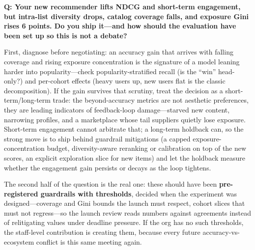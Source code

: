 \begin{interviewq}

\end{interviewq}

\begin{interviewq}
\textbf{Q: Your new recommender lifts NDCG and short-term engagement, but intra-list diversity drops, catalog coverage falls, and exposure Gini rises 6 points. Do you ship it---and how should the evaluation have been set up so this is not a debate?}

 \quad {} \quad \badgefreq{\freqmed}

\stronganswer

First, diagnose before negotiating: an accuracy gain that arrives with falling coverage and rising exposure concentration is the signature of a model leaning harder into popularity---check popularity-stratified recall (is the ``win'' head-only?) and per-cohort effects (heavy users up, new users flat is the classic decomposition). If the gain survives that scrutiny, treat the decision as a short-term/long-term trade: the beyond-accuracy metrics are not aesthetic preferences, they are leading indicators of feedback-loop damage---starved new content, narrowing profiles, and a marketplace whose tail suppliers quietly lose exposure. Short-term engagement cannot arbitrate that; a long-term holdback can, so the strong move is to ship behind guardrail mitigations (a capped exposure-concentration budget, diversity-aware reranking or calibration on top of the new scores, an explicit exploration slice for new items) and let the holdback measure whether the engagement gain persists or decays as the loop tightens.

The second half of the question is the real one: these should have been \textbf{pre-registered guardrails with thresholds}, decided when the experiment was designed---coverage and Gini bounds the launch must respect, cohort slices that must not regress---so the launch review reads numbers against agreements instead of relitigating values under deadline pressure. If the org has no such thresholds, the staff-level contribution is creating them, because every future accuracy-vs-ecosystem conflict is this same meeting again.


\end{interviewq}
